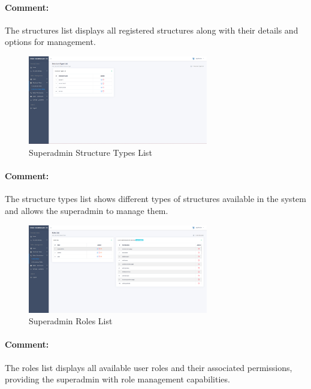 \begin{itemize}
\paragraph{Comment:} The structures list displays all registered structures along with their details and options for management.
\newpage

\begin{figure}[htbp]
  \centering
  \includegraphics[width=0.7\textwidth]{SCREENSHOTS/superadmin/structureTypes_list.png}
  \caption{Superadmin Structure Types List}
  \label{fig:structure-types-list}
\end{figure}
\paragraph{Comment:} The structure types list shows different types of structures available in the system and allows the superadmin to manage them.

\begin{figure}[htbp]
  \centering
  \includegraphics[width=0.7\textwidth]{SCREENSHOTS/superadmin/roles_list.png}
  \caption{Superadmin Roles List}
  \label{fig:roles-list}
\end{figure}
\paragraph{Comment:} The roles list displays all available user roles and their associated permissions, providing the superadmin with role management capabilities.
\newpage




\end{itemize}
